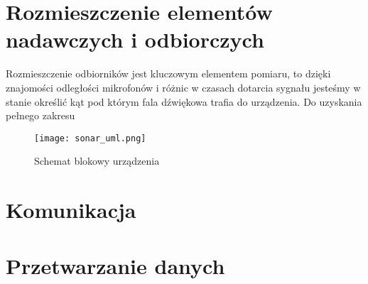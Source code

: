 \section{Rozmieszczenie elementów nadawczych i odbiorczych}
Rozmieszczenie odbiorników jest kluczowym elementem pomiaru, to dzięki znajomości odległości mikrofonów i różnic w czasach 
dotarcia sygnału jesteśmy w stanie określić kąt pod którym fala dźwiękowa trafia do urządzenia. Do uzyskania pełnego zakresu 

\begin{figure}[ht!]
    \centering
    \texttt{[image: sonar\_uml.png]}
    \caption{Schemat blokowy urządzenia}
    \label{fig:uml}
\end{figure}



\section{Komunikacja}


\section{Przetwarzanie danych}